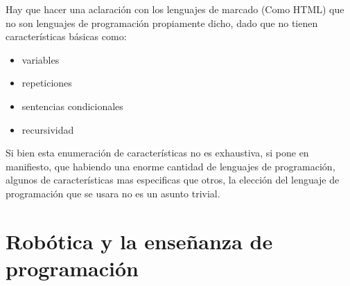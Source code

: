 Hay que hacer una aclaración con los lenguajes de marcado (Como HTML) que no son lenguajes de programación propiamente dicho, dado que no tienen características básicas como:

\begin{itemize}
   \item variables
   \item repeticiones
   \item sentencias condicionales
   \item recursividad
 \end{itemize} 
 
Si bien esta enumeración de características no es exhaustiva, si pone en manifiesto, que habiendo una enorme cantidad de lenguajes de programación, algunos de características mas especificas que otros, la elección del lenguaje de programación que se usara no es un asunto trivial.


\section{Robótica y la enseñanza de programación}

